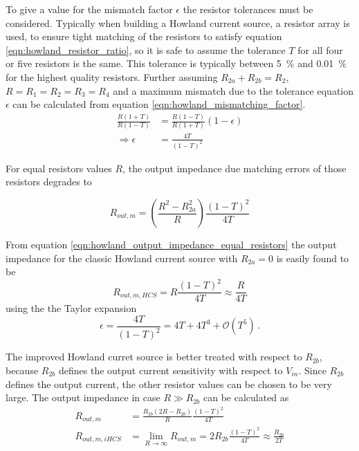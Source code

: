 \documentclass[12pt]{book}
\begin{document}
To give a value for the mismatch factor $\epsilon$ the resistor tolerances must be considered. Typically when building a Howland current source, a resistor array is used, to ensure tight matching of the resistors to satisfy equation \ref{eqn:howland_resistor_ratio}, so it is safe to assume the tolerance $T$ for all four or five resistors is the same. This tolerance is typically between \qty{5}{\percent} and \qty{0.01}{\percent} for the highest quality resistors. Further assuming $R_{2a} + R_{2b} = R_2$, $R = R_1 = R_2 = R_3 = R_4$ and a maximum mismatch due to the tolerance equation $\epsilon$ can be calculated from equation \ref{eqn:howland_mismatching_factor}.
\begin{align}
    \frac{R (1+T)}{R (1-T)} &= \frac{R (1-T)}{R (1+T)} \left(1-\epsilon\right) \nonumber\\
    \Rightarrow \epsilon &= \frac{4 T}{(1-T)^2} \label{eqn:howland_current_source_worst_case_mismatch}
\end{align}

For equal resistors values $R$, the output impedance due matching errors of those resistors degrades to

\begin{equation}
    R_{out,m} = \left(\frac{R^2 - R_{2a}^2}{R}\right) \frac{(1-T)^2}{4 T} \label{eqn:howland_output_impedance_equal_resistors}
\end{equation}

From equation \ref{eqn:howland_output_impedance_equal_resistors} the output impedance for the classic Howland current source with $R_{2a} = 0$ is easily found to be
\begin{equation}
    R_{out,m,HCS} = R \frac{(1-T)^2}{4 T} \approx \frac{R}{4 T}
\end{equation}
using the the Taylor expansion
\begin{equation*}
    \epsilon = \frac{4 T}{(1-T)^2} = 4 T + 4 T^3 + \mathcal{O}(T^5)\,.
\end{equation*}

The improved Howland curret source is better treated with respect to $R_{2b}$, because $R_{2b}$ defines the output current sensitivity with respect to $V_{in}$. Since $R_{2b}$ defines the output current, the other resistor values can be chosen to be very large. The output impedance in case $R \gg R_{2b}$ can be calculated as
\begin{align}
    R_{out,m} &= \frac{R_{2b} \left(2 R - R_{2b}\right)}{R} \frac{(1-T)^2}{4 T}\nonumber\\
    R_{out,m,iHCS} &= \lim_{R \to \infty} R_{out,m} = 2 R_{2b} \frac{(1-T)^2}{4 T} \approx \frac{R_{2b}}{2 T} \label{eqn:improved_howland_output_impedance_equal_resistors}
\end{align}
\end{document}

